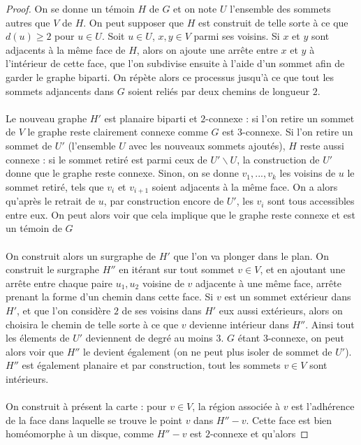 \documentclass{scrartcl}
\begin{document}
\begin{flushleft}
\begin{proof}
    On se donne un témoin $H$ de $G$ et on note $U$ l'ensemble des sommets autres que $V$ de $H$. On peut supposer que $H$
    est construit de telle sorte à ce que $d(u) \geq 2$ pour $u \in U$. Soit $u \in U$, $x, y \in V$ parmi ses voisins.
    Si $x$ et $y$ sont adjacents à la même face de $H$, alors on ajoute une arrête entre $x$ et $y$ à l'intérieur de cette face,
    que l'on subdivise ensuite à l'aide d'un sommet afin de garder le graphe biparti. On répète alors
    ce processus jusqu'à ce que tout les sommets adjancents dans $G$ soient reliés par deux chemins de longueur $2$.
    \\~\\
    Le nouveau graphe $H'$ est planaire biparti et $2$-connexe : si l'on retire un sommet de $V$ le graphe reste clairement
    connexe comme $G$ est $3$-connexe. Si l'on retire un sommet de $U'$ (l'ensemble $U$ avec les nouveaux sommets ajoutés),
    $H$ reste aussi connexe :
    si le sommet retiré est parmi ceux de $U' \backslash U$, la construction de $U'$ donne que le graphe reste connexe. Sinon,
    on se donne $v_1, ..., v_k$ les voisins de $u$ le sommet retiré, tels que $v_i$ et $v_{i+1}$ soient adjacents à la
    même face. On a alors qu'après le retrait de $u$, par construction encore de $U'$, les $v_i$ sont tous accessibles
    entre eux. On peut alors voir que cela implique que le graphe reste connexe et est un témoin de $G$
    \\~\\
    On construit alors un surgraphe de $H'$ que l'on va plonger dans le plan. On construit le
    surgraphe $H''$ en itérant sur tout sommet $v \in V$, et en ajoutant une arrête entre chaque paire $u_1, u_2$
    voisine de $v$ adjacente à une même face, arrête prenant la forme d'un chemin dans cette face. Si $v$ est
    un sommet extérieur dans $H'$, et que l'on considère $2$ de ses voisins dans $H'$ eux aussi extérieurs,
    alors on choisira le chemin de telle sorte à ce que $v$ devienne intérieur dans $H''$.
    Ainsi tout les élements de $U'$ deviennent de degré au moins $3$. $G$ étant $3$-connexe, on peut alors voir que $H''$
    le devient également (on ne peut plus isoler de sommet de $U'$). $H''$ est également planaire et par construction,
    tout les sommets $v \in V$ sont intérieurs.
    \\~\\
    On construit à présent la carte : pour $v \in V$, la région associée à $v$ est l'adhérence de la face dans laquelle se trouve
    le point $v$ dans $H'' - v$. Cette face est bien homéomorphe à un disque, comme $H'' - v$ est $2$-connexe et qu'alors

\end{proof}
\end{flushleft}
\end{document}
